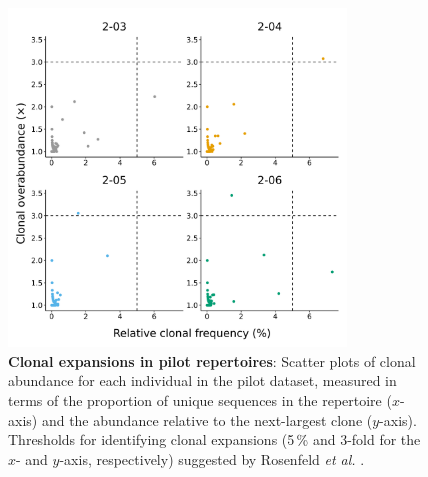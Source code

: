 \begin{figure}
\centering
\includegraphics[width=0.8\textwidth]{_Figures/png/pilot-clones-expansions}
\caption[Clonal expansions in \Nfu pilot repertoires]{\textbf{Clonal expansions in \Nfu pilot repertoires}: Scatter plots of clonal abundance for each individual in the pilot \igseq dataset, measured in terms of the proportion of unique sequences in the repertoire ($x$-axis) and the abundance relative to the next-largest clone ($y$-axis). Thresholds for identifying clonal expansions (5\,\% and 3-fold for the $x$- and $y$-axis, respectively) suggested by Rosenfeld \textit{et al.} \parencite{rosenfeld2018clonesize}.}
\label{fig:igseq-pilot-clones-expansions}
\end{figure}

